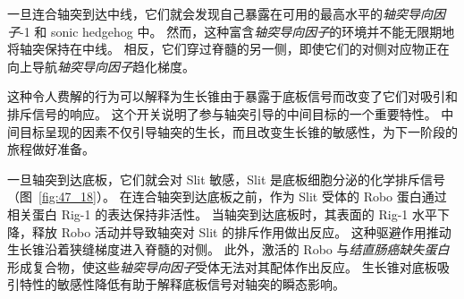 一旦连合轴突到达中线，它们就会发现自己暴露在可用的最高水平的\textit{轴突导向因子}-1 和 sonic hedgehog 中。
然而，这种富含\textit{轴突导向因子}的环境并不能无限期地将轴突保持在中线。
相反，它们穿过脊髓的另一侧，即使它们的对侧对应物正在向上导航\textit{轴突导向因子}趋化梯度。


这种令人费解的行为可以解释为生长锥由于暴露于底板信号而改变了它们对吸引和排斥信号的响应。
这个开关说明了参与轴突引导的中间目标的一个重要特性。
中间目标呈现的因素不仅引导轴突的生长，而且改变生长锥的敏感性，为下一阶段的旅程做好准备。


一旦轴突到达底板，它们就会对 Slit 敏感，Slit 是底板细胞分泌的化学排斥信号（图~\ref{fig:47_18}）。
在连合轴突到达底板之前，作为 Slit 受体的 Robo 蛋白通过相关蛋白 Rig-1 的表达保持非活性。
当轴突到达底板时，其表面的 Rig-1 水平下降，释放 Robo 活动并导致轴突对 Slit 的排斥作用做出反应。
这种驱避作用推动生长锥沿着狭缝梯度进入脊髓的对侧。
此外，激活的 Robo 与\textit{结直肠癌缺失蛋白}形成复合物，使这些\textit{轴突导向因子}受体无法对其配体作出反应。
生长锥对底板吸引特性的敏感性降低有助于解释底板信号对轴突的瞬态影响。


